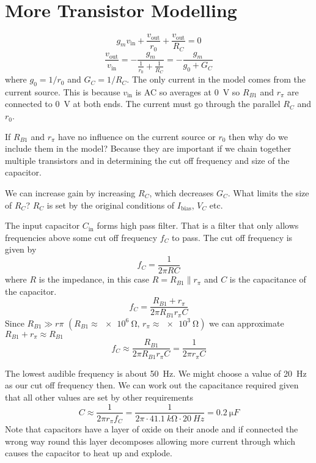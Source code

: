 \documentclass{article}
\begin{document}
    \section{More Transistor Modelling}
    \[g_mv_\text{in} + \frac{v_\text{out}}{r_0} + \frac{v_\text{out}}{R_C} = 0\]
    \[\frac{v_\text{out}}{v_\text{in}} = -\frac{g_m}{\frac{1}{r_0} + \frac{1}{R_C}} = -\frac{g_m}{g_0 + G_C}\]
    where \(g_0 = 1/r_0\) and \(G_C = 1/R_C\).
    The only current in the model comes from the current source. 
    This is because \(v_\text{in}\) is AC so averages at \SI{0}{V} so \(R_{B1}\) and \(r_\pi\) are connected to \SI{0}{V} at both ends.
    The current must go through the parallel \(R_C\) and \(r_0\).
    
    If \(R_{B1}\) and \(r_\pi\) have no influence on the current source or \(r_0\) then why do we include them in the model? 
    Because they are important if we chain together multiple transistors and in determining the cut off frequency and size of the capacitor.
    
    We can increase gain by increasing \(R_C\), which decreases \(G_C\). What limits the size of \(R_C\)?
    \(R_C\) is set by the original conditions of \(I_\text{bias}\), \(V_C\) etc.
    
    The input capacitor \(C_\text{in}\) forms high pass filter. 
    That is a filter that only allows frequencies above some cut off frequency \(f_C\) to pass.
    The cut off frequency is given by
    \[f_C = \frac{1}{2\pi RC}\]
    where \(R\) is the impedance, in this case \(R = R_{B1}\parallel r_\pi\) and \(C\) is the capacitance of the capacitor.
    \[f_C = \frac{R_{B1} + r_\pi}{2\pi R_{B1} r_\pi C}\]
    Since \(R_{B1}\gg r\pi\) \((R_{B1} \approx \SI{e6}{\ohm},\,r_\pi\approx \SI{e3}{\ohm})\) we can approximate \(R_{B1} + r_\pi\approx R_{B1}\)
    \[f_C \approx \frac{R_{B1}}{2\pi R_{B1}r_\pi C} = \frac{1}{2\pi r_\pi C}\]
    
    The lowest audible frequency is about \SI{50}{Hz}. 
    We might choose a value of \SI{20}{Hz} as our cut off frequency then. 
    We can work out the capacitance required given that all other values are set by other requirements
    \[C\approx \frac{1}{2\pi r_\pi f_C} = \frac{1}{2\pi \cdot \SI{41.1}{k\ohm}\cdot\SI{20}{Hz}} = \SI{0.2}{\micro F}\]
    Note that capacitors have a layer of oxide on their anode and if connected the wrong way round this layer decomposes allowing more current through which causes the capacitor to heat up and explode.
    
\end{document}
